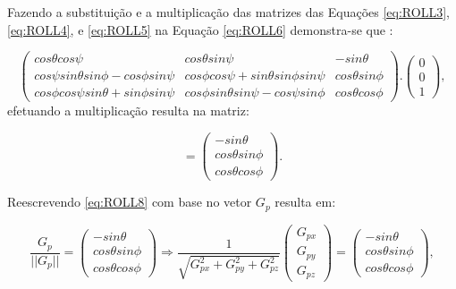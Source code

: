     Fazendo a substituição e a multiplicação das matrizes das Equações \ref{eq:ROLL3}, \ref{eq:ROLL4}, e \ref{eq:ROLL5} na Equação \ref{eq:ROLL6} demonstra-se que  \cite{nxp:acell}:
    
    \begin{equation}
        \begin{pmatrix}
            cos \theta cos \psi & cos \theta sin \psi & -sin \theta \\
            
            cos \psi sin \theta sin \phi - cos \phi sin \psi & 
            cos\phi cos\psi + sin \theta sin \phi sin \psi &
            cos \theta sin \phi \\
            
            cos \phi cos\psi sin \theta  + sin\phi sin\psi &
            cos \phi sin \theta sin \psi - cos \psi sin \phi &
            cos \theta cos\phi 
            
        \end{pmatrix}
        .
        \begin{pmatrix}
            0 \\ 0 \\ 1
        \end{pmatrix}
        \label{eq:ROLL7}
        ,
    \end{equation}
    efetuando a multiplicação resulta na matriz:
    
    \begin{equation}
    = 
        \begin{pmatrix}
        -sin \theta \\ cos\theta sin \phi \\ cos\theta cos \phi
        \end{pmatrix}
        \label{eq:ROLL8}
        .
    \end{equation}
    
    Reescrevendo \ref{eq:ROLL8} com base no vetor $G_p$ resulta em:

    \begin{equation}
        \frac{G_p}{|| G_p ||}
        = 
        \begin{pmatrix}
            -sin \theta \\ cos\theta sin \phi \\ cos\theta cos \phi
        \end{pmatrix}
        \Rightarrow
        \frac{1}{\sqrt{G_{px}^2 + G_{py}^2 + G_{pz}^2}}
        \begin{pmatrix} 
            G_{px} \\ G_{py} \\ G_{pz} 
        \end{pmatrix}
        =
        \begin{pmatrix}
            -sin \theta \\ cos\theta sin \phi \\ cos\theta cos \phi
        \end{pmatrix}
        \label{eq:ROLL9}
        ,
    \end{equation}
    
